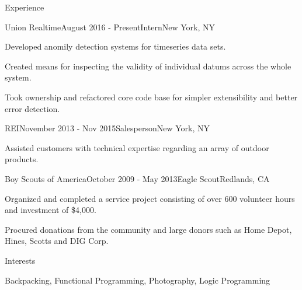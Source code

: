 \documentclass{resume} %
\begin{document}
\begin{rSection}{Experience}

\begin{rSubsection}{Union Realtime}{August 2016 - Present}{Intern}{New York, NY}
\item Developed anomily detection systems for timeseries data sets.
\item Created means for inspecting the validity of individual datums across the whole system.
\item Took ownership and refactored core code base for simpler extensibility and better error detection.
\end{rSubsection}


\begin{rSubsection}{REI}{November 2013 - Nov 2015}{Salesperson}{New York, NY}
\item Assisted customers with technical expertise regarding an array of outdoor products.
\end{rSubsection}


\begin{rSubsection}{Boy Scouts of America}{October 2009 - May 2013}{Eagle Scout}{Redlands, CA}
\item Organized and completed a service project consisting of over 600 volunteer hours and investment of \$4,000.
\item Procured donations from the community and large donors such as Home Depot, Hines, Scotts and DIG Corp.
\end{rSubsection}

\end{rSection}


\begin{rSection}{Interests}

Backpacking, Functional Programming, Photography, Logic Programming

\end{rSection}





\end{document}
